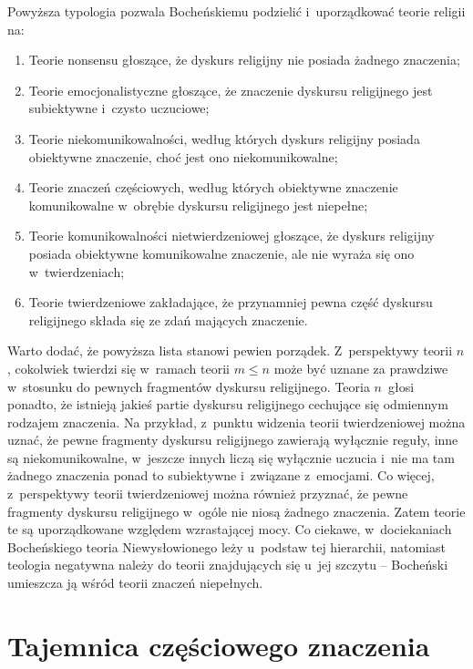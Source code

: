 Powyższa typologia pozwala Bocheńskiemu podzielić i~uporządkować teorie religii na:

\begin{enumerate}
\item Teorie nonsensu głoszące, że dyskurs religijny nie posiada żadnego znaczenia;
\item Teorie emocjonalistyczne głoszące, że znaczenie dyskursu religijnego jest subiektywne i~czysto uczuciowe;
\item Teorie niekomunikowalności, według których dyskurs religijny posiada obiektywne znaczenie, choć jest ono niekomunikowalne;
\item Teorie znaczeń częściowych, według których obiektywne znaczenie komunikowalne w~obrębie dyskursu religijnego jest niepełne;
\item Teorie komunikowalności nietwierdzeniowej głoszące, że dyskurs religijny posiada obiektywne komunikowalne znaczenie, ale nie wyraża się ono w~twierdzeniach;
\item Teorie twierdzeniowe zakładające, że przynamniej pewna część dyskursu religijnego składa się ze zdań mających znaczenie.
\end{enumerate}
Warto dodać, że powyższa lista stanowi pewien porządek. Z~perspektywy teorii $n$, cokolwiek twierdzi się w~ramach teorii $m\leq n$ może być uznane za prawdziwe w~stosunku do pewnych fragmentów dyskursu religijnego. Teoria $n$~głosi ponadto, że istnieją jakieś partie dyskursu religijnego cechujące się odmiennym rodzajem znaczenia. Na przykład, z~punktu widzenia teorii twierdzeniowej można uznać, że pewne fragmenty dyskursu religijnego zawierają wyłącznie reguły, inne są niekomunikowalne, w~jeszcze innych liczą się wyłącznie uczucia i~nie ma tam żadnego znaczenia ponad to subiektywne i~związane z~emocjami. Co więcej, z~perspektywy teorii twierdzeniowej można również przyznać, że pewne fragmenty dyskursu religijnego w~ogóle nie niosą żadnego znaczenia. Zatem teorie te są uporządkowane względem wzrastającej mocy. Co ciekawe, w~dociekaniach Bocheńskiego teoria Niewysłowionego leży u~podstaw tej hierarchii, natomiast teologia negatywna należy do teorii znajdujących się u~jej szczytu -- Bocheński umieszcza ją wśród teorii znaczeń niepełnych.


\section{Tajemnica częściowego znaczenia}\label{sil-boch-tajem}

